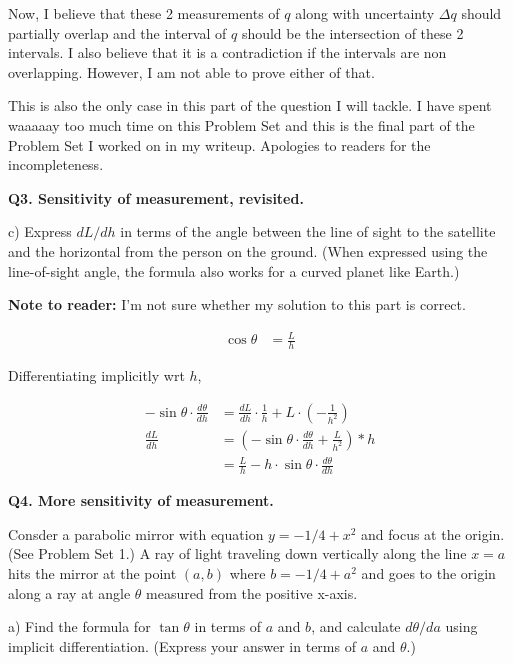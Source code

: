 \documentclass[9pt]{article}
\begin{document}
Now, I believe that these 2 measurements of $q$ along with uncertainty $\Delta q$ should partially overlap and the interval of $q$ should be the intersection of these 2 intervals. I also believe that it is a contradiction if the intervals are non overlapping. However, I am not able to prove either of that.

This is also the only case in this part of the question I will tackle. I have spent waaaaay too much time on this Problem Set and this is the final part of the Problem Set I worked on in my writeup. Apologies to readers for the incompleteness.

\begin{tcolorbox}
  \textbf{Q3. Sensitivity of measurement, revisited.}

  c) Express $dL/dh$ in terms of the angle between the line of sight to the satellite and the horizontal from the person on the ground. (When expressed using the line-of-sight angle, the formula also works for a curved planet like Earth.)
\end{tcolorbox}

\textbf{Note to reader:} I'm not sure whether my solution to this part is correct.

\begin{align*}
  \cos \theta &= \frac{L}{h}
\end{align*}

Differentiating implicitly wrt $h$,

\begin{align*}
  -\sin\theta \cdot \frac{d\theta}{dh} &= \frac{dL}{dh} \cdot \frac{1}{h} + L \cdot (-\frac{1}{h^2}) \\
  \frac{dL}{dh} &= (-\sin\theta \cdot \frac{d\theta}{dh} + \frac{L}{h^2}) * h \\
                &= \frac{L}{h} - h \cdot \sin\theta \cdot \frac{d\theta}{dh}
\end{align*}



\begin{tcolorbox}
  \textbf{Q4. More sensitivity of measurement.}

  Consder a parabolic mirror with equation $y = -1/4 + x^2$ and focus at the origin. (See Problem Set 1.) A ray of light traveling down vertically along the line $x = a$ hits the mirror at the point $(a, b)$ where $b = -1/4 + a^2$ and goes to the origin along a ray at angle $\theta$ measured from the positive x-axis.

  a) Find the formula for $\tan\theta$ in terms of $a$ and $b$, and calculate $d\theta / da$ using implicit differentiation. (Express your answer in terms of $a$ and $\theta$.)
\end{tcolorbox}
\end{document}
